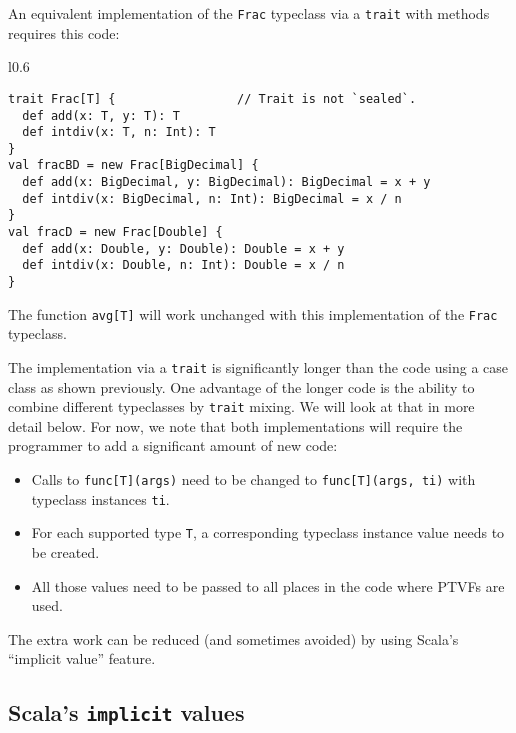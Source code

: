 An equivalent implementation of the \lstinline!Frac! typeclass via
a \lstinline!trait! with methods requires this code:

\begin{wrapfigure}{l}{0.6\columnwidth}%
\vspace{-0.65\baselineskip}
\begin{lstlisting}
trait Frac[T] {                 // Trait is not `sealed`.
  def add(x: T, y: T): T
  def intdiv(x: T, n: Int): T
}
val fracBD = new Frac[BigDecimal] {
  def add(x: BigDecimal, y: BigDecimal): BigDecimal = x + y
  def intdiv(x: BigDecimal, n: Int): BigDecimal = x / n
}
val fracD = new Frac[Double] {
  def add(x: Double, y: Double): Double = x + y
  def intdiv(x: Double, n: Int): Double = x / n
}
\end{lstlisting}

\vspace{-0.85\baselineskip}
\end{wrapfigure}%

\noindent The function \lstinline!avg[T]! will work unchanged with
this implementation of the \lstinline!Frac! typeclass.

The implementation via a \lstinline!trait! is significantly longer
than the code using a case class as shown previously. One advantage
of the longer code is the ability to combine different typeclasses
by \lstinline!trait! mixing. We will look at that in more detail
below. For now, we note that both implementations will require the
programmer to add a significant amount of new code:
\begin{itemize}
\item Calls to \lstinline!func[T](args)! need to be changed to \lstinline!func[T](args, ti)!
with typeclass instances \lstinline!ti!.
\item For each supported type \lstinline!T!, a corresponding typeclass
instance value needs to be created.
\item All those values need to be passed to all places in the code where
PTVFs are used.
\end{itemize}
The extra work can be reduced (and sometimes avoided) by using Scala\textsf{'}s
\textsf{``}implicit value\textsf{''} feature. 

\subsection{Scala\textsf{'}s \texttt{implicit} values}


